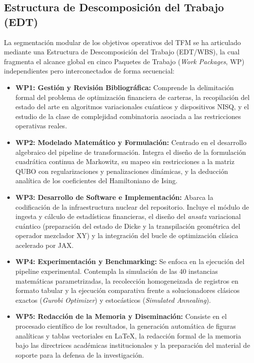 \subsection{Estructura de Descomposición del Trabajo (EDT)}
La segmentación modular de los objetivos operativos del TFM se ha articulado mediante una Estructura de Descomposición del Trabajo (EDT/WBS), la cual fragmenta el alcance global en cinco Paquetes de Trabajo (\textit{Work Packages}, WP) independientes pero interconectados de forma secuencial:
\begin{itemize}
    \item \textbf{WP1: Gestión y Revisión Bibliográfica:} Comprende la delimitación formal del problema de optimización financiera de carteras, la recopilación del estado del arte en algoritmos variacionales cuánticos y dispositivos NISQ, y el estudio de la clase de complejidad combinatoria asociada a las restricciones operativas reales.
    \item \textbf{WP2: Modelado Matemático y Formulación:} Centrado en el desarrollo algebraico del pipeline de transformación. Integra el diseño de la formulación cuadrática continua de Markowitz, su mapeo sin restricciones a la matriz QUBO con regularizaciones y penalizaciones dinámicas, y la deducción analítica de los coeficientes del Hamiltoniano de Ising.
    \item \textbf{WP3: Desarrollo de Software e Implementación:} Abarca la codificación de la infraestructura nuclear del repositorio. Incluye el módulo de ingesta y cálculo de estadísticas financieras, el diseño del \textit{ansatz} variacional cuántico (preparación del estado de Dicke y la transpilación geométrica del operador mezclador XY) y la integración del bucle de optimización clásica acelerado por JAX.
    \item \textbf{WP4: Experimentación y Benchmarking:} Se enfoca en la ejecución del pipeline experimental. Contempla la simulación de las 40 instancias matemáticas parametrizadas, la recolección homogeneizada de registros en formato tabular y la ejecución comparativa frente a solucionadores clásicos exactos (\textit{Gurobi Optimizer}) y estocásticos (\textit{Simulated Annealing}).
    \item \textbf{WP5: Redacción de la Memoria y Diseminación:} Consiste en el procesado científico de los resultados, la generación automática de figuras analíticas y tablas vectoriales en LaTeX, la redacción formal de la memoria bajo las directrices académicas institucionales y la preparación del material de soporte para la defensa de la investigación.
\end{itemize}


